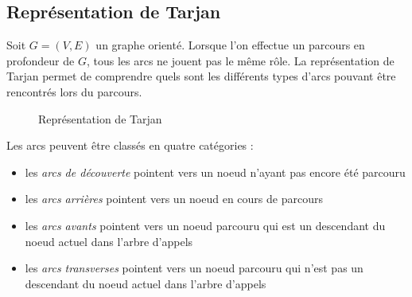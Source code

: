 \documentclass[11pt,a4paper]{article}
\begin{document}
  \subsection{Représentation de Tarjan}
Soit \(G=(V,E)\) un graphe orienté. Lorsque l'on effectue un parcours en profondeur de \(G\), tous les arcs ne jouent pas le même rôle. La représentation de Tarjan permet de comprendre quels sont les différents types d'arcs pouvant être rencontrés lors du parcours.

\begin{figure}[h]
  \label{representation-tarjan}
  \centering
  \caption{Représentation de Tarjan}
\end{figure}

Les arcs peuvent être classés en quatre catégories :
\begin{itemize}
  \item[\LARGE\textbf\textrightarrow] les \textit{arcs de découverte} pointent vers un noeud n'ayant pas encore été parcouru
  \item[\color{red} \LARGE\textbf\textrightarrow] les \textit{arcs arrières} pointent vers un noeud en cours de parcours
  \item[\color{green} \LARGE\textbf\textrightarrow] les \textit{arcs avants} pointent vers un noeud parcouru qui est un descendant du noeud actuel dans l'arbre d'appels
  \item[\color{blue} \LARGE\textbf\textrightarrow] les \textit{arcs transverses} pointent vers un noeud parcouru qui n'est pas un descendant du noeud actuel dans l'arbre d'appels
\end{itemize}
\end{document}
